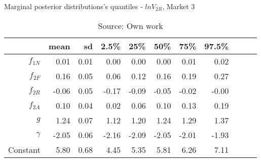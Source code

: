 \begin{table}[H]
\caption{Marginal posterior distributions's quantiles - $ln V_{2R}$,  Market 3}
\centering
\begin{tabular}{rrrrrrrrrrr}
  \toprule
          & mean  & sd   & 2.5\% & 25\%  & 50\%  & 75\%  & 97.5\%\\ 
  \hline
  $f_{1N}$ & 0.01  & 0.01 & 0.00  & 0.00  & 0.00  & 0.01  & 0.02  \\ 
  $f_{2F}$ & 0.16  & 0.05 & 0.06  & 0.12  & 0.16  & 0.19  & 0.27  \\ 
  $f_{2R}$ & -0.06 & 0.05 & -0.17 & -0.09 & -0.05 & -0.02 & -0.00 \\ 
  $f_{2A}$ & 0.10  & 0.04 & 0.02  & 0.06  & 0.10  & 0.13  & 0.19  \\ 
  $g$      & 1.24  & 0.07 & 1.12  & 1.20  & 1.24  & 1.29  & 1.37  \\ 
  $\gamma$ & -2.05 & 0.06 & -2.16 & -2.09 & -2.05 & -2.01 & -1.93 \\ 
  Constant & 5.80  & 0.68 & 4.45  & 5.35  & 5.81  & 6.26  & 7.11  \\ 
     \bottomrule
\end{tabular}
\caption*{Source: Own work}
\end{table}
